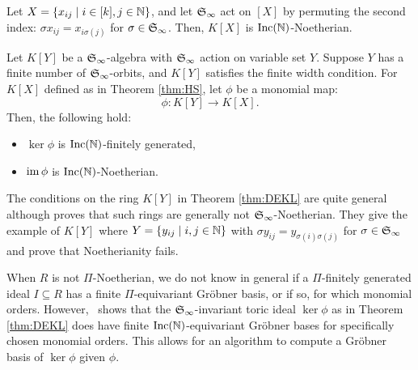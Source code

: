 \begin{theorem}\label{thm:HS}
 Let $X = \{x_{ij} \mid i \in [k], j \in \mathbb N\}$, and let $\mathfrak S_\infty$ act on $[X]$ by permuting the second index: $\sigma x_{ij} = x_{i\sigma(j)}$ for $\sigma \in \mathfrak S_\infty$.  Then, $K[X]$ is $\operatorname{Inc}(\mathbb N)$-Noetherian.
\end{theorem}

\begin{theorem}\label{thm:DEKL}
 Let $K[Y]$ be a $\mathfrak S_\infty$-algebra with $\mathfrak S_\infty$ action on variable set $Y$.  Suppose $Y$ has a finite number of $\mathfrak S_\infty$-orbits, and $K[Y]$ satisfies the finite width condition.  For $K[X]$ defined as in Theorem \ref{thm:HS}, let $\phi$ be a monomial map:
  \[ \phi: K[Y] \to K[X]. \]
 Then, the following hold:
 \begin{itemize}
  \item $\ker \phi$ is $\operatorname{Inc}(\mathbb N)$-finitely generated,
  \item $\operatorname{im} \phi$ is $\operatorname{Inc}(\mathbb N)$-Noetherian.
 \end{itemize}
\end{theorem}

The conditions on the ring $K[Y]$ in Theorem \ref{thm:DEKL} are quite general although \cite{hillar2012finite} proves that such rings are generally not $\mathfrak S_\infty$-Noetherian.  They give the example of $K[Y]$ where $Y = \{y_{ij} \mid i, j \in \mathbb N\}$ with $\sigma y_{ij} = y_{\sigma(i)\sigma(j)}$ for $\sigma \in \mathfrak S_\infty$ and prove that Noetherianity fails.

When $R$ is not $\Pi$-Noetherian, we do not know in general if a $\Pi$-finitely generated ideal $I\subseteq R$ has a finite $\Pi$-equivariant Gr\"obner basis, or if so, for which monomial orders.  However,~\cite{Krone:egb-toric} shows that the $\mathfrak S_\infty$-invariant toric ideal $\ker \phi$ as in Theorem \ref{thm:DEKL} does have finite $\operatorname{Inc}(\mathbb N)$-equivariant Gr\"obner bases for specifically chosen monomial orders.  This allows for an algorithm to compute a Gr\"obner basis of $\ker \phi$ given $\phi$.
